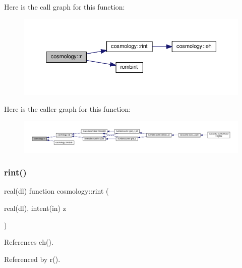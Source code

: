 Here is the call graph for this function\+:
\nopagebreak
\begin{figure}[H]
\begin{center}
\leavevmode
\includegraphics[width=350pt]{namespacecosmology_a5acb8c4886ff7017542c3c1ec551f357_cgraph}
\end{center}
\end{figure}
Here is the caller graph for this function\+:
\nopagebreak
\begin{figure}[H]
\begin{center}
\leavevmode
\includegraphics[width=350pt]{namespacecosmology_a5acb8c4886ff7017542c3c1ec551f357_icgraph}
\end{center}
\end{figure}
\mbox{\label{namespacecosmology_a9203d5591635fce503b42a2121a1dfaa}} 
\subsubsection{\texorpdfstring{rint()}{rint()}}
{\footnotesize\ttfamily real(dl) function cosmology\+::rint (\begin{DoxyParamCaption}\item[{real(dl), intent(in)}]{z }\end{DoxyParamCaption})}



References eh().



Referenced by r().

